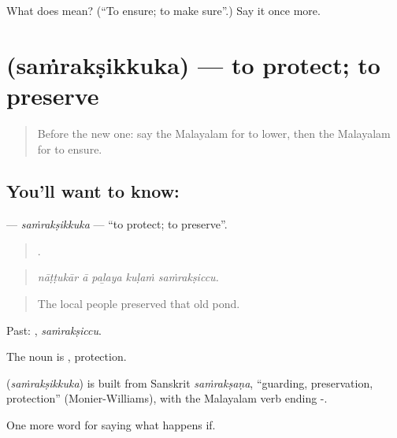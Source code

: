 \begin{tcolorbox}[breakable,colback=teal!4,colframe=teal!35!black,title={Before you move on}]
What does  mean? (\textquotedblleft{}To ensure; to make sure\textquotedblright{}.) Say it once more.
\end{tcolorbox}
\section[\texorpdfstring{\ml{സംരക്ഷിക്കുക} (saṁrakṣikkuka)}{സംരക്ഷിക്കുക (saṁrakṣikkuka)}]{ (saṁrakṣikkuka) — to protect; to preserve}

\label{lesson:ML-C450-samraksikkuka}



\begin{quote}
Before the new one: say the Malayalam for to lower, then the Malayalam for to ensure.
\end{quote}

\subsection*{You'll want to know: }
\textbf{} — \emph{saṁrakṣikkuka} — \textquotedblleft{}to protect; to preserve\textquotedblright{}.

\begin{quote}
    .
\end{quote}

\begin{quote}
\emph{nāṭṭukār ā paḻaya kuḷaṁ saṁrakṣiccu.}
\end{quote}

\begin{quote}
The local people preserved that old pond.
\end{quote}

Past: , \emph{saṁrakṣiccu}.

The noun is , protection.

\begin{cousinweb}
\textbf{} (\emph{saṁrakṣikkuka}) is built from Sanskrit \emph{saṁrakṣaṇa}, \textquotedblleft{}guarding, preservation, protection\textquotedblright{} (Monier-Williams), with the Malayalam verb ending -.
\end{cousinweb}

\begin{grammarlens}[title={What you've built}]
One more word for saying what happens if.
\end{grammarlens}


